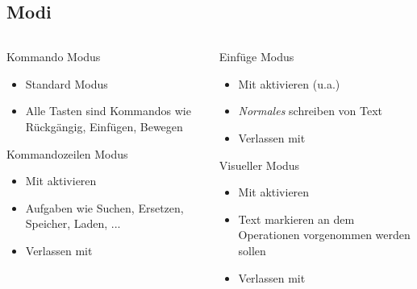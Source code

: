 \documentclass[aspectratio=43]{beamer}
\begin{document}
\subsection{Modi}
\begin{frame} 
\begin{columns}
        \begin{column}{0.5\textwidth}
          
          \begin{block}{Kommando ­Modus} 
            \begin{itemize}
            \item Standard Modus
            \item Alle Tasten sind Kommandos wie Rückgängig, Einfügen, Bewegen
            \end{itemize}
          \end{block}
          
          \begin{block}{Kommandozeilen­ Modus} 
            \begin{itemize}
            \item Mit \taste{:} aktivieren
            \item Aufgaben wie Suchen, Ersetzen, Speicher, Laden, ...
            \item Verlassen mit 
            \end{itemize}
          \end{block}
          
         \end{column} 
        \begin{column}{0.5\textwidth}

          \begin{block}{Einfüge­ Modus} 
            \begin{itemize}
            \item Mit  aktivieren (u.a.)
            \item \textit{Normales} schreiben von Text
            \item Verlassen mit 
            \end{itemize}
          \end{block}
          
          \begin{block}{Visueller Modus} 
            \begin{itemize}
            \item Mit  aktivieren
            \item Text markieren an dem Operationen vorgenommen werden sollen
            \item Verlassen mit 
            \end{itemize}
          \end{block}
        
        \end{column} 
\end{columns}
\end{frame}
\end{document}
